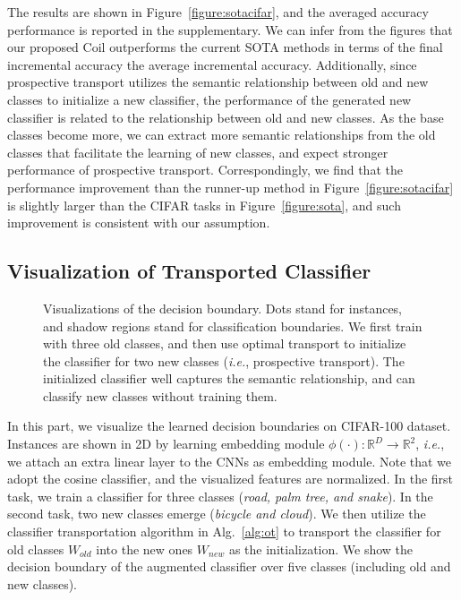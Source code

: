 \documentclass[sigconf]{acmart}
\newcommand{\ie}{\emph{i.e.}}
\newcommand{\name}{{\sc Coil }}
\begin{document}
The results are shown in Figure~\ref{figure:sotacifar}, and the averaged accuracy performance is reported in the supplementary. We can infer from the figures that our proposed \name outperforms the current SOTA methods in terms of the final incremental accuracy the average incremental accuracy. 
Additionally, since prospective transport utilizes the semantic relationship between old and new classes to initialize a new classifier,  the performance of the generated new classifier is related to the relationship between old and new classes. As the base classes become more, we can extract more semantic relationships from the old classes that facilitate the learning of new classes, and expect stronger performance of prospective transport. Correspondingly, we find that the performance improvement than the runner-up method in Figure~\ref{figure:sotacifar} is slightly larger than the CIFAR tasks in Figure~\ref{figure:sota}, and such improvement is consistent with our assumption.




\subsection{Visualization of Transported Classifier} \label{sec:vis}

\begin{figure}[t]
	\begin{center}
		\vspace{-3mm}
	\end{center}
	\caption{ \small Visualizations of the decision boundary. Dots stand for instances, and shadow regions stand for classification boundaries. We first train with three old classes, and then use optimal transport to initialize the classifier for two new classes (\ie, prospective transport). The initialized  classifier well captures the semantic relationship, and can classify new classes without training them.} \label{figure:visulization}	
	\vspace{-5mm}
\end{figure}

In this part, we visualize the learned decision boundaries on CIFAR-100 dataset. Instances are shown in 2D by learning embedding module $\phi(\cdot):\mathbb{R}^{D} \rightarrow \mathbb{R}^{2}$, \ie, we attach an extra linear layer  to the CNNs as embedding module. Note that we adopt the cosine classifier, and the visualized features are normalized. In the first task, we train a classifier for three classes (\emph{road, palm tree, and snake}). In the second task, two new classes emerge (\emph{bicycle and cloud}). We then utilize the classifier transportation algorithm in Alg.~\ref{alg:ot} to transport the classifier for old classes $W_{old}$ into the new ones $W_{new}$ as the initialization. We show the decision boundary of the augmented classifier over five classes (including old and new classes).
\end{document}
